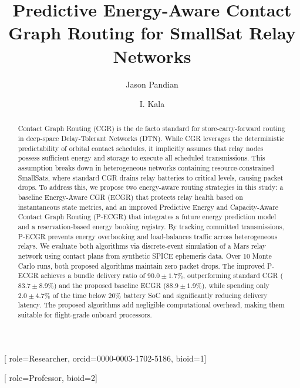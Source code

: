 \documentclass[a4paper,fleqn]{cas-dc}
\newcommand{\ecgr}{\textsf{ECGR}}
\newcommand{\pecgr}{\textsf{P-ECGR}}
\begin{document}
\let\WriteBookmarks\relax
\def\floatpagepagefraction{1}
\def\textpagefraction{.001}


\title [mode = title]{Predictive Energy-Aware Contact Graph Routing for SmallSat Relay Networks}

\author[1]{Jason Pandian}[
                        role=Researcher,
                        orcid=0000-0003-1702-5186,
                        bioid=1]
\cormark[1]


\author[2]{I. Kala}[
                        role=Professor,
                        bioid=2]



\begin{abstract}
Contact Graph Routing (CGR) is the de facto standard for store-carry-forward routing in deep-space Delay-Tolerant Networks (DTN). While CGR leverages the deterministic predictability of orbital contact schedules, it implicitly assumes that relay nodes possess sufficient energy and storage to execute all scheduled transmissions. This assumption breaks down in heterogeneous networks containing resource-constrained SmallSats, where standard CGR drains relay batteries to critical levels, causing packet drops. To address this, we propose two energy-aware routing strategies in this study: a baseline Energy-Aware CGR (\ecgr{}) that protects relay health based on instantaneous state metrics, and an improved Predictive Energy and Capacity-Aware Contact Graph Routing (\pecgr{}) that integrates a future energy prediction model and a reservation-based energy booking registry. By tracking committed transmissions, \pecgr{} prevents energy overbooking and load-balances traffic across heterogeneous relays. We evaluate both algorithms via discrete-event simulation of a Mars relay network using contact plans from synthetic SPICE ephemeris data. Over 10 Monte Carlo runs, both proposed algorithms maintain zero packet drops. The improved \pecgr{} achieves a bundle delivery ratio of $90.0 \pm 1.7\%$, outperforming standard CGR ($83.7 \pm 8.9\%$) and the proposed baseline \ecgr{} ($88.9 \pm 1.9\%$), while spending only $2.0 \pm 4.7\%$ of the time below $20\%$ battery SoC and significantly reducing delivery latency. The proposed algorithms add negligible computational overhead, making them suitable for flight-grade onboard processors.
\end{abstract}
\end{document}
